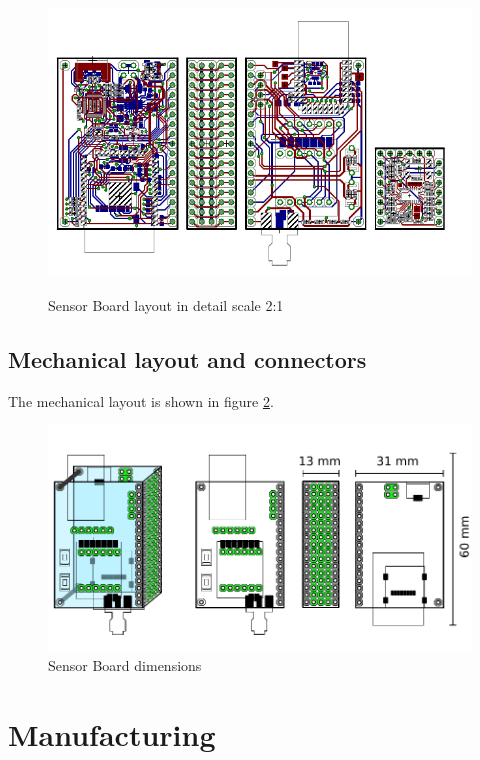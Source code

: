\begin{figure}
	\centering
	\includegraphics[angle=90, scale=2]{img/brd.pdf}
	\label{brd2}
	\caption{Sensor Board layout in detail scale 2:1}
\end{figure}

\subsection{Mechanical layout and connectors}
The mechanical layout is shown in figure \ref{fig:HWdimensions}.

\begin{figure}
	\centering
	\label{fig:HWdimensions}
	\caption{Sensor Board dimensions}
	\includegraphics[scale=1]{img/HWdimensions.pdf}
\end{figure}

\section{Manufacturing}
\label{HWmanufacturing}

